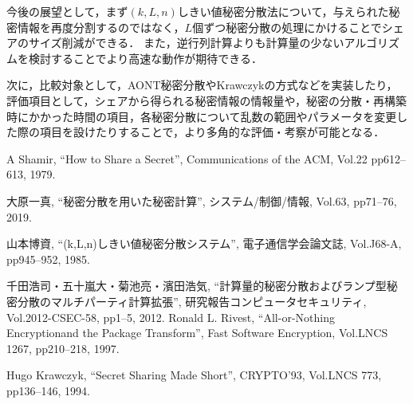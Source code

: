 \documentclass[twocolumn]{jarticle}
\begin{document}
今後の展望として，まず$(k,L,n)$しきい値秘密分散法について，与えられた秘密情報を再度分割するのではなく，$L$個ずつ秘密分散の処理にかけることでシェアのサイズ削減ができる．
%
また，逆行列計算よりも計算量の少ないアルゴリズムを検討することでより高速な動作が期待できる．

次に，比較対象として，AONT秘密分散\cite{rivest}やKrawczykの方式\cite{krawczyk}などを実装したり，評価項目として，シェアから得られる秘密情報の情報量や，秘密の分散・再構築時にかかった時間の項目，各秘密分散について乱数の範囲やパラメータを変更した際の項目を設けたりすることで，より多角的な評価・考察が可能となる．


\vspace{8mm}
\begin{thebibliography}{9}
	\renewcommand{\baselinestretch}{1.0}
	\small
		A Shamir,
		``How to Share a Secret'',
		Communications of the ACM, Vol.22 pp612--613, 1979.

		大原一真,
		``秘密分散を用いた秘密計算'',
		システム/制御/情報, Vol.63, pp71--76, 2019.

		山本博資,
		``(k,L,n)しきい値秘密分散システム'',
		電子通信学会論文誌, Vol.J68-A, pp945--952, 1985.

		千田浩司・五十嵐大・菊池亮・濱田浩気,
		``計算量的秘密分散およびランプ型秘密分散のマルチパーティ計算拡張'',
		研究報告コンピュータセキュリティ, Vol.2012-CSEC-58, pp1--5, 2012.
		Ronald L. Rivest,
		``All-or-Nothing Encryptionand the Package Transform'',
		Fast Software Encryption, Vol.LNCS 1267, pp210--218, 1997.

		Hugo Krawczyk,
		``Secret Sharing Made Short'',
		CRYPTO'93, Vol.LNCS 773, pp136--146, 1994.
\end{thebibliography}
\end{document}
